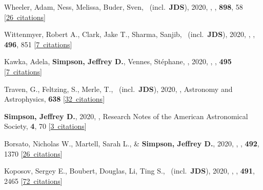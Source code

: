 \item[{\color{numcolor}\scriptsize46}] Wheeler, Adam, Ness, Melissa, Buder, Sven, \etal\ (incl.\ \textbf{JDS}), 2020, , \apj, \textbf{898}, 58 [\href{https://ui.adsabs.harvard.edu/#abs/2020ApJ...898...58W}{26~citations}]

\item[{\color{numcolor}\scriptsize45}] Wittenmyer, Robert A., Clark, Jake T., Sharma, Sanjib, \etal\ (incl.\ \textbf{JDS}), 2020, , \mnras, \textbf{496}, 851 [\href{https://ui.adsabs.harvard.edu/#abs/2020MNRAS.496..851W}{7~citations}]

\item[{\color{numcolor}\scriptsize44}] Kawka, Adela, \textbf{Simpson, Jeffrey D.}, Vennes, St{\'e}phane, \etal, 2020, , \mnras, \textbf{495} [\href{https://ui.adsabs.harvard.edu/#abs/2020MNRAS.495L.129K}{7~citations}]

\item[{\color{numcolor}\scriptsize43}] Traven, G., Feltzing, S., Merle, T., \etal\ (incl.\ \textbf{JDS}), 2020, , Astronomy and Astrophysics, \textbf{638} [\href{https://ui.adsabs.harvard.edu/#abs/2020A&A...638A.145T}{32~citations}]

\item[{\color{numcolor}\scriptsize42}] \textbf{Simpson, Jeffrey D.}, 2020, , Research Notes of the American Astronomical Society, \textbf{4}, 70 [\href{https://ui.adsabs.harvard.edu/#abs/2020RNAAS...4...70S}{3~citations}]

\item[{\color{numcolor}\scriptsize41}] Borsato, Nicholas W., Martell, Sarah L., \& \textbf{Simpson, Jeffrey D.}, 2020, , \mnras, \textbf{492}, 1370 [\href{https://ui.adsabs.harvard.edu/#abs/2020MNRAS.492.1370B}{26~citations}]

\item[{\color{numcolor}\scriptsize40}] Koposov, Sergey E., Boubert, Douglas, Li, Ting S., \etal\ (incl.\ \textbf{JDS}), 2020, , \mnras, \textbf{491}, 2465 [\href{https://ui.adsabs.harvard.edu/#abs/2020MNRAS.491.2465K}{72~citations}]

